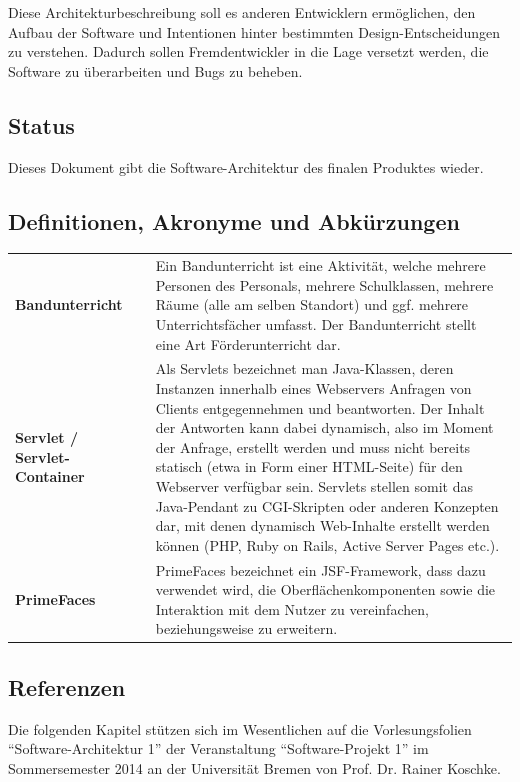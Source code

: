 \documentclass[fontsize=12pt,paper=a4,twoside]{scrartcl}
\renewcommand{\arraystretch}{1.2}
\begin{document}
Diese Architekturbeschreibung soll es anderen Entwicklern ermöglichen, den Aufbau der Software und Intentionen hinter bestimmten Design-Entscheidungen zu verstehen. Dadurch sollen Fremdentwickler in die Lage versetzt werden, die Software zu überarbeiten und Bugs zu beheben.

\subsection{Status}
Dieses Dokument gibt die Software-Architektur des finalen Produktes wieder.


  
\subsection{Definitionen, Akronyme und Abkürzungen}
\label{subsec:definitionen}
\renewcommand{\arraystretch}{2}
\begin{tabularx}{\textwidth}{Xp{1cm}p{9.5cm}}
\textbf{Bandunterricht} 	&  	& 	Ein Bandunterricht ist eine Aktivität, welche mehrere Personen des Personals, mehrere Schulklassen, mehrere Räume (alle am selben Standort) und ggf. mehrere Unterrichtsfächer umfasst. Der Bandunterricht stellt eine Art Förderunterricht dar. \\ 
\textbf{Servlet / Servlet-Container} &   &   Als Servlets bezeichnet man Java-Klassen, deren Instanzen innerhalb eines Webservers Anfragen von Clients entgegennehmen und beantworten. Der Inhalt der Antworten kann dabei dynamisch, also im Moment der Anfrage, erstellt werden und muss nicht bereits statisch (etwa in Form einer HTML-Seite) für den Webserver verfügbar sein. Servlets stellen somit das Java-Pendant zu CGI-Skripten oder anderen Konzepten dar, mit denen dynamisch Web-Inhalte erstellt werden können (PHP, Ruby on Rails, Active Server Pages etc.).\\
\textbf{PrimeFaces	}				&	& PrimeFaces bezeichnet ein JSF-Framework, dass dazu verwendet wird, die Oberflächenkomponenten sowie die Interaktion mit dem Nutzer zu vereinfachen, beziehungsweise zu erweitern.
\end{tabularx} 
\renewcommand{\arraystretch}{1.4}

\newpage
\subsection{Referenzen}
Die folgenden Kapitel stützen sich im Wesentlichen auf die Vorlesungsfolien "`Software-Architektur 1"' der Veranstaltung "`Software-Projekt 1"' im Sommersemester 2014 an der Universität Bremen von Prof. Dr. Rainer Koschke.
\end{document}

